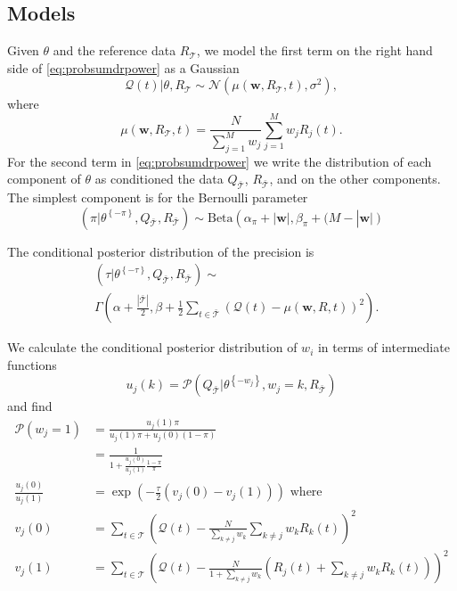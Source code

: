 \documentclass[journal]{IEEEtran}
\newcommand{\normal}[2]{{\mathcal{N}} \left(#1,#2 \right)}
\newcommand{\prob}{\mathcal{P}}
\newcommand{\eventset}{\mathcal{T}}
\newcommand{\wvector}{\mathbf w}
\newcommand{\context}{{\bar {\mathcal{T}}}}
\newcommand{\drpower}{Q}
\newcommand{\sumdrpower}{{\mathcal{Q}}}
\newcommand{\referencepower}{R}
\newcommand{\outdr}{\drpower_\context}
\newcommand{\inreference}{\referencepower_\eventset}
\newcommand{\outreference}{\referencepower_\context}
\newcommand{\thetasans}[1]{\theta^{\left\{-#1\right\}}}
\begin{document}
\subsection{Models}
\label{sec:models}

Given $\theta$ and the reference data $\inreference$, we model the
first term on the right hand side of \eqref{eq:probsumdrpower} as a
Gaussian
\begin{equation*}
  \sumdrpower(t)|\theta, \inreference \sim \normal{\mu(\wvector,
    \inreference,t)}{\sigma^2},
\end{equation*}
where
\begin{equation*}
  \mu(\wvector, \inreference,t) =
  \frac{N}{\sum_{j=1}^{M}{w_j}}\sum_{j=1}^M w_j \referencepower_j(t).
\end{equation*}
For the second term in \eqref{eq:probsumdrpower} we write the
distribution of each component of $\theta$ as conditioned the data
$\outdr$, $\outreference$, and on the other components.  The simplest
component is for the Bernoulli parameter
\begin{equation}
  \label{eq:bernoulli}
  \left( \pi | \thetasans{\pi}, \outdr, \outreference \right) \sim
  \text{Beta} \left( \alpha_\pi + \left| \wvector \right|, \beta_\pi +
    (M - \right| \wvector \left| \right)
\end{equation}

The conditional posterior  distribution of the precision is
\begin{align}
  &(\tau | \thetasans{\tau}, \outdr, \outreference)  \sim \nonumber \\
  \label{cond:distributionTau}
  &\Gamma \left(
    \alpha+\frac{\left| \context \right| }{2},
    \beta + \frac{1}{2}\sum_{t\in \context} \left( \sumdrpower(t) -
      \mu(\wvector, \referencepower, t) \right)^2 \right).
\end{align}

We calculate the conditional posterior  distribution of $w_i$ in terms
of intermediate functions
\begin{equation*}
  u_j(k) = \prob(\outdr|\thetasans{w_j}, w_j=k, \outreference)
\end{equation*}
and find
\begin{align*}
  \prob(w_j=1)
  &= \frac{u_j(1) \pi}{u_j(1)\pi + u_j(0)(1-\pi)} \\
  &= \frac{1}{1+ \frac{u_j(0)}{u_j(1)}\frac{1-\pi}{\pi}} \\
  \frac{u_j(0)}{u_j(1)}
  &= \exp \left( -\frac{\tau}{2} \left( v_j(0) - v_j(1) \right)
    \right) \text{ where} \\
  v_j(0) &= \sum_{t\in\eventset} \left(
           \sumdrpower(t) - \frac{N}{\sum_{k\neq j}w_k} \sum_{k\neq j}
           w_k \referencepower_k(t) \right)^2 \\
  v_j(1) &= \sum_{t\in\eventset} \left(
           \sumdrpower(t) - \frac{N}{1+\sum_{k\neq j}w_k} \left(
           \referencepower_j(t) + \sum_{k\neq j}
           w_k \referencepower_k(t) \right) \right)^2
\end{align*}
\end{document}
